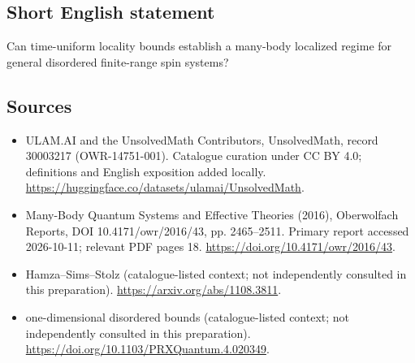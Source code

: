 \documentclass[11pt]{article}
\begin{document}
\subsection{Short English statement}
Can time-uniform locality bounds establish a many-body localized regime for general disordered finite-range spin systems?
\subsection{Sources}
\begin{itemize}
\item[\hypertarget{source:30003217:1}{S1}] ULAM.AI and the UnsolvedMath Contributors, UnsolvedMath, record 30003217 (OWR-14751-001). Catalogue curation under CC BY 4.0; definitions and English exposition added locally.
\url{https://huggingface.co/datasets/ulamai/UnsolvedMath}.
\item[\hypertarget{source:30003217:2}{S2}] Many-Body Quantum Systems and Effective Theories (2016), Oberwolfach Reports, DOI 10.4171/owr/2016/43, pp. 2465--2511. Primary report accessed 2026-10-11; relevant PDF pages 18.
\url{https://doi.org/10.4171/owr/2016/43}.
\item[\hypertarget{source:30003217:3}{S3}] Hamza--Sims--Stolz (catalogue-listed context; not independently consulted in this preparation).
\url{https://arxiv.org/abs/1108.3811}.
\item[\hypertarget{source:30003217:4}{S4}] one-dimensional disordered bounds (catalogue-listed context; not independently consulted in this preparation).
\url{https://doi.org/10.1103/PRXQuantum.4.020349}.
\end{itemize}
\label{end:30003217}
\end{document}
